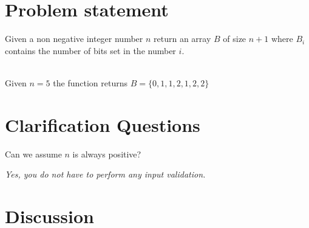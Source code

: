 \section{Problem statement}
\begin{exercise}
\label{example:count_bits:exercice1}
Given a non negative integer number $n$ return an array $B$ of size $n+1$ where $B_i$ contains the
number of bits set in the number $i$.
	\begin{example}
		\label{example:count_bits:example1}
		\hfill \\
		Given $n = 5$ the function returns $B = \{0,1,1,2,1,2,2\}$	
	\end{example}

\end{exercise}

\section{Clarification Questions}

\begin{QandA}
	\item \begin{questionitem} \begin{question} Can we assume $n$ is always positive?  \end{question} 	 
    \begin{answered}
		\textit{Yes, you do not have to perform any input validation.}
	\end{answered} \end{questionitem}
	
\end{QandA}

\section{Discussion}
\label{count_bits:sec:discussion}


